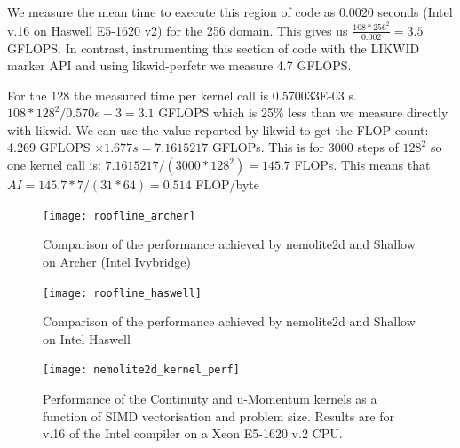 \documentclass[12pt]{article}
\begin{document}
We measure the mean time to execute this region of code as 0.0020
seconds (Intel v.16 on Haswell E5-1620 v2) for the 256 domain. This
gives us $\frac{108*256^2}{0.002} = 3.5$ GFLOPS. In contrast,
instrumenting this section of code with the LIKWID marker API and
using likwid-perfctr we measure 4.7 GFLOPS.

For the 128 the measured time per kernel call is 0.570033E-03 s.
$108*128^2/0.570e-3 = 3.1$ GFLOPS which is 25\% less than we measure
directly with likwid.  We can use the value reported by likwid to get
the FLOP count: 4.269 GFLOPS $\times 1.677 s = 7.1615217$ GFLOPs. This is for
3000 steps of $128^2$ so one kernel call is: $7.1615217/(3000*128^2) =
145.7$ FLOPs. This means that $AI = 145.7*7/(31*64) = 0.514$ FLOP/byte

\begin{figure}
\centering
\texttt{[image: roofline\_archer]}
\caption{Comparison of the performance achieved by nemolite2d and Shallow on Archer (Intel Ivybridge)}
\label{FIG_roofline_archer}
\end{figure}

\begin{figure}
\centering
\texttt{[image: roofline\_haswell]}
\caption{Comparison of the performance achieved by nemolite2d and Shallow on Intel Haswell}
\label{FIG_roofline_haswell}
\end{figure}

\begin{figure}
  \centering
  \texttt{[image: nemolite2d\_kernel\_perf]}
  \caption{Performance of the Continuity and u-Momentum kernels as a
    function of SIMD vectorisation and problem size. Results are for
    v.16 of the Intel compiler on a Xeon E5-1620 v.2 CPU.}
  \label{FIG_kernel_perf}
\end{figure}
\end{document}
